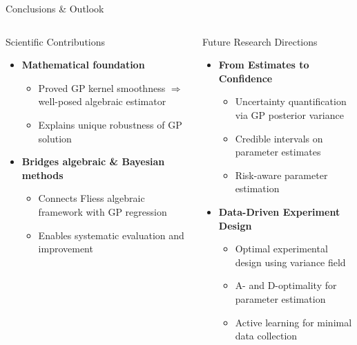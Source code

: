 \documentclass[aspectratio=169]{beamer}
\begin{document}
\begin{frame}{Conclusions \& Outlook}
\begin{columns}[T]
\begin{column}{0.32\textwidth}
\begin{block}{\small Scientific Contributions}
\begin{itemize}
          \item \textbf{Mathematical foundation}
          \begin{itemize}
            \tiny
            \item Proved GP kernel smoothness $\Rightarrow$ well-posed algebraic estimator
            \item Explains unique robustness of GP solution
          \end{itemize}
          
          \item \textbf{Bridges algebraic \& Bayesian methods}
          \begin{itemize}
            \tiny
            \item Connects Fliess algebraic framework with GP regression
            \item Enables systematic evaluation and improvement
          \end{itemize}
        \end{itemize}
      \end{block}
    \end{column}
    
    \begin{column}{0.32\textwidth}
      \begin{block}{\small Future Research Directions}
        \tiny
        \begin{itemize}
          \item \textbf{From Estimates to Confidence}
          \begin{itemize}
            \tiny
            \item Uncertainty quantification via GP posterior variance
            \item Credible intervals on parameter estimates
            \item Risk-aware parameter estimation
          \end{itemize}
          
          \item \textbf{Data-Driven Experiment Design}
          \begin{itemize}
            \tiny
            \item Optimal experimental design using variance field
            \item A- and D-optimality for parameter estimation
            \item Active learning for minimal data collection
          \end{itemize}
          

\end{itemize}
\end{block}
\end{column}
\end{columns}
\end{frame}
\end{document}

